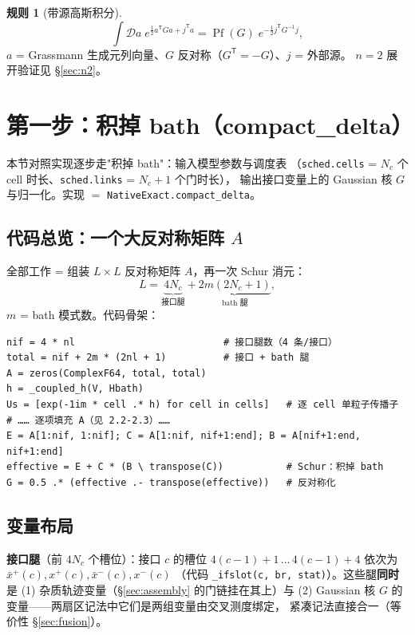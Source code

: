 \documentclass[11pt,a4paper]{ctexart}
\newcommand{\Pf}{\operatorname{Pf}}
\theoremstyle{plain}
\theoremstyle{definition}
\newtheorem{rulethm}[identity]{规则}
\theoremstyle{remark}
\begin{document}
\begin{rulethm}[带源高斯积分]\label{rule:gauss}
\begin{equation}
\int \mathcal{D}a\; e^{\frac12 a^{\mathsf T} G a + j^{\mathsf T} a}
= \Pf(G)\; e^{-\frac12 j^{\mathsf T} G^{-1} j} ,
\label{eq:gauss}
\end{equation}
$a$ = Grassmann 生成元列向量、$G$ 反对称（$G^{\mathsf T} = -G$）、$j$ = 外部源。
$n = 2$ 展开验证见 \S\ref{sec:n2}。
\end{rulethm}

\section{第一步：积掉 bath（compact\_delta）}

本节对照实现逐步走"积掉 bath"：输入模型参数与调度表
（\texttt{sched.cells} = $N_c$ 个 cell 时长、\texttt{sched.links} = $N_c{+}1$ 个门时长），
输出接口变量上的 Gaussian 核 $G$ 与归一化。实现 $=$ \texttt{NativeExact.compact\_delta}。

\subsection{代码总览：一个大反对称矩阵 \texorpdfstring{$A$}{A}}\label{sec:schur}

全部工作 = 组装 $L\times L$ 反对称矩阵 $A$，再一次 Schur 消元：
\begin{equation}
L = \underbrace{4N_c}_{\text{接口腿}} + \underbrace{2m(2N_c+1)}_{\text{bath 腿}} ,
\end{equation}
$m$ = bath 模式数。代码骨架：
\begin{lstlisting}[style=julia]
nif = 4 * nl                          # 接口腿数（4 条/接口）
total = nif + 2m * (2nl + 1)          # 接口 + bath 腿
A = zeros(ComplexF64, total, total)
h = _coupled_h(V, Hbath)
Us = [exp(-1im * cell .* h) for cell in cells]   # 逐 cell 单粒子传播子
# …… 逐项填充 A（见 2.2-2.3）……
E = A[1:nif, 1:nif]; C = A[1:nif, nif+1:end]; B = A[nif+1:end, nif+1:end]
effective = E + C * (B \ transpose(C))           # Schur：积掉 bath
G = 0.5 .* (effective .- transpose(effective))   # 反对称化
\end{lstlisting}

\subsection{变量布局}

\textbf{接口腿}（前 $4N_c$ 个槽位）：接口 $c$ 的槽位
$4(c{-}1){+}1 \,\ldots\, 4(c{-}1){+}4$ 依次为
$\bar x^{+}(c), x^{+}(c), \bar x^{-}(c), x^{-}(c)$
（代码 \texttt{\_ifslot(c, br, stat)}）。这些腿\textbf{同时}是
(1) 杂质轨迹变量（\S\ref{sec:assembly} 的门链挂在其上）与
(2) Gaussian 核 $G$ 的变量——两扇区记法中它们是两组变量由交叉测度绑定，
紧凑记法直接合一（等价性 \S\ref{sec:fusion}）。
\end{document}
